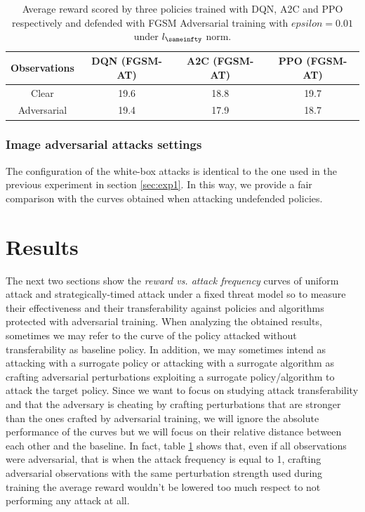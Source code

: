 \begin{table}
  \centering
  \caption{Average reward scored by three policies trained with DQN, A2C and PPO respectively and defended with FGSM Adversarial training with \(epsilon=0.01\) under \(l_\sameinfty\) norm.}
  \begin{tabular}{cccc}
    \toprule
    Observations & DQN (FGSM-AT) & A2C (FGSM-AT) & PPO (FGSM-AT) \\
    \midrule
     Clear & 19.6 & 18.8 & 19.7 \\ 
     Adversarial & 19.4 & 17.9 & 18.7 \\
    \bottomrule
  \end{tabular}
  \label{table:adv_def}
\end{table}

\subsubsection{Image adversarial attacks settings}
The configuration of the white-box attacks is identical to the one used in the previous experiment in section \ref{sec:exp1}. In this way, we provide a fair comparison with the curves obtained when attacking undefended policies.

\section{Results}
The next two sections show the {\it reward vs. attack frequency} curves of uniform attack and strategically-timed attack under a fixed threat model so to measure their effectiveness and their transferability against policies and algorithms protected with adversarial training. When analyzing the obtained results, sometimes we may refer to the curve of the policy attacked without transferability as baseline policy. In addition, we may sometimes intend as attacking with a surrogate policy or attacking with a surrogate algorithm as crafting adversarial perturbations exploiting a surrogate policy/algorithm to attack the target policy. Since we want to focus on studying attack transferability and that the adversary is cheating by crafting perturbations that are stronger than the ones crafted by adversarial training, we will ignore the absolute performance of the curves but we will focus on their relative distance between each other and the baseline. In fact, table \ref{table:adv_def} shows that, even if all observations were adversarial, that is when the attack frequency is equal to 1, crafting adversarial observations with the same perturbation strength used during training the average reward wouldn't be lowered too much respect to not performing any attack at all.

